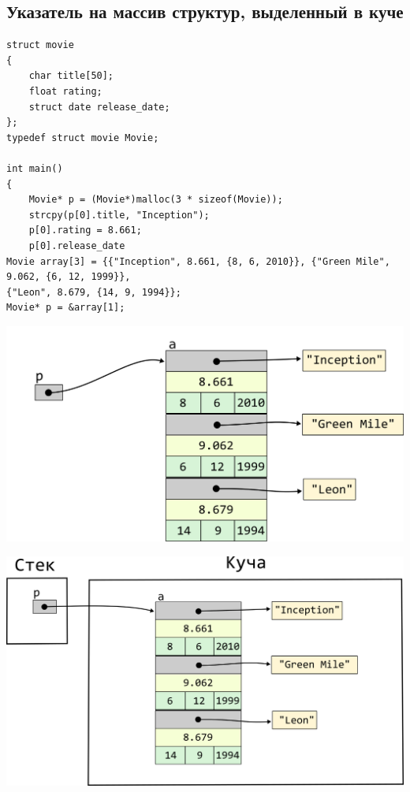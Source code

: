 \documentclass{article}
\begin{document}
\subsection*{Указатель на массив структур, выделенный в куче}
\begin{lstlisting}
struct movie
{
	char title[50];
	float rating;
	struct date release_date;
};
typedef struct movie Movie;

int main()
{
	Movie* p = (Movie*)malloc(3 * sizeof(Movie));
	strcpy(p[0].title, "Inception");
	p[0].rating = 8.661;
	p[0].release_date
Movie array[3] = {{"Inception", 8.661, {8, 6, 2010}}, {"Green Mile", 9.062, {6, 12, 1999}}, 
{"Leon", 8.679, {14, 9, 1994}};
Movie* p = &array[1];
\end{lstlisting}
\begin{center}
\includegraphics[scale=1]{../../images/pointer_schemes/pointer_to_array_of_struct_movie_charpointers.png}
\end{center}

\begin{center}
\includegraphics[scale=1]{../../images/pointer_schemes/pointer_to_array_of_struct_movie_charpointers_segments.png}
\end{center}
\end{document}
